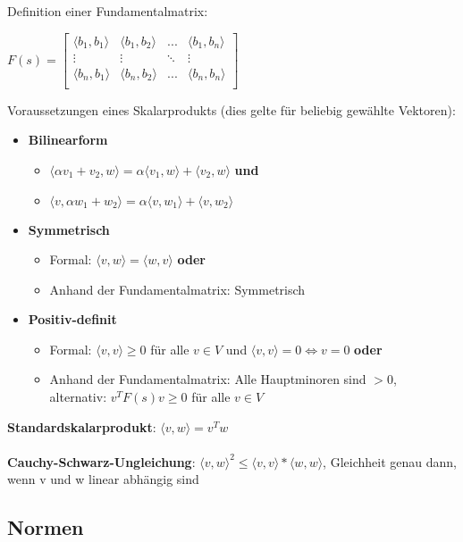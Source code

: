 \documentclass[10pt,a4paper]{article}
\begin{document}
	Definition einer Fundamentalmatrix:
	\begin{center}
		$F(s) = \begin{bmatrix}
		\langle b_1, b_1\rangle & \langle b_1, b_2\rangle & ... & \langle b_1, b_n\rangle\\
		\vdots & \vdots & \ddots & \vdots \\
		\langle b_n, b_1\rangle & \langle b_n, b_2\rangle & ... & \langle b_n, b_n\rangle\\			
		\end{bmatrix}$
	\end{center}
	Voraussetzungen eines Skalarprodukts (dies gelte für beliebig gewählte Vektoren):
	\begin{itemize}
		\item \textbf{Bilinearform}
		\begin{itemize}
			\item $\langle \alpha v_1 + v_2, w\rangle = \alpha\langle  v_1, w\rangle + \langle v_2, w\rangle$ \textbf{und}
			\item $\langle v, \alpha w_1 + w_2\rangle = \alpha\langle  v, w_1\rangle + \langle v, w_2\rangle$
		\end{itemize}
		\item \textbf{Symmetrisch}
		\begin{itemize}
			\item Formal: $\langle v, w\rangle = \langle w, v\rangle$ \textbf{oder}
			\item Anhand der Fundamentalmatrix: Symmetrisch
		\end{itemize}
		\item \textbf{Positiv-definit}
		\begin{itemize}
			\item Formal: $\langle v, v\rangle \geq 0$ für alle $v \in V$ und $\langle v, v\rangle = 0 \Leftrightarrow v = 0$ \textbf{oder}
			\item Anhand der Fundamentalmatrix: Alle Hauptminoren sind $> 0$,\\alternativ: $v^TF(s)v \geq 0$ für alle $v \in V$
		\end{itemize}
	\end{itemize}
	\textbf{Standardskalarprodukt}: $\langle v, w\rangle = v^Tw$\\\\
	\textbf{Cauchy-Schwarz-Ungleichung}: $\langle v, w\rangle^2 \leq \langle v, v\rangle * \langle w, w\rangle$, Gleichheit genau dann, wenn v und w linear abhängig sind
	
	\subsection{Normen}
	\label{sp:sub:normen}
	
\end{document}
